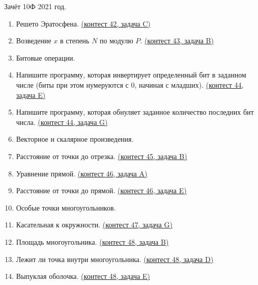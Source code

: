 \documentclass[a4paper,12pt]{article}
\begin{document}
Зачёт 10Ф 2021 год.
\begin{enumerate}
\item Решето Эратосфена. \href{https://informatics.msk.ru/mod/statements/view3.php?chapterid=112450}{(контест 42, задача C)}
\item Возведение $x$ в степень $N$ по модулю $P$. \href{https://informatics.msk.ru/mod/statements/view3.php?chapterid=111741}{(контест 43, задача B)}
\item Битовые операции.
\item Напишите программу, которая инвертирует определенный бит в заданном числе (биты при этом нумеруются с 0, начиная с младших). \href{https://informatics.msk.ru/mod/statements/view3.php?chapterid=111741}{(контест 44, задача E)}
\item Напишите программу, которая обнуляет заданное количество последних бит числа. \href{https://informatics.msk.ru/mod/statements/view3.php?chapterid=121}{(контест 44, задача G)}
\item Векторное и скалярное произведения.
\item Расстояние от точки до отрезка. \href{https://informatics.msk.ru/mod/statements/view3.php?chapterid=279}{(контест 45, задача B)}
\item Уравнение прямой. \href{https://informatics.msk.ru/mod/statements/view3.php?chapterid=270}{(контест 46, задача A)}
\item Расстояние от точки до прямой. \href{https://informatics.msk.ru/mod/statements/view3.php?chapterid=270}{(контест 46, задача E)}
\item Особые точки многоугольников.
\item Касательная к окружности. \href{https://informatics.msk.ru/mod/statements/view3.php?chapterid=283}{(контест 47, задача G)}
\item Площадь многоугольника. \href{https://informatics.msk.ru/mod/statements/view3.php?chapterid=446}{(контест 48, задача B)}
\item Лежит ли точка внутри многоугольника. \href{https://informatics.msk.ru/mod/statements/view3.php?chapterid=288}{(контест 48, задача D)}
\item Выпуклая оболочка. \href{https://informatics.msk.ru/mod/statements/view3.php?chapterid=638}{(контест 48, задача E)}
\end{enumerate}
\end{document}
